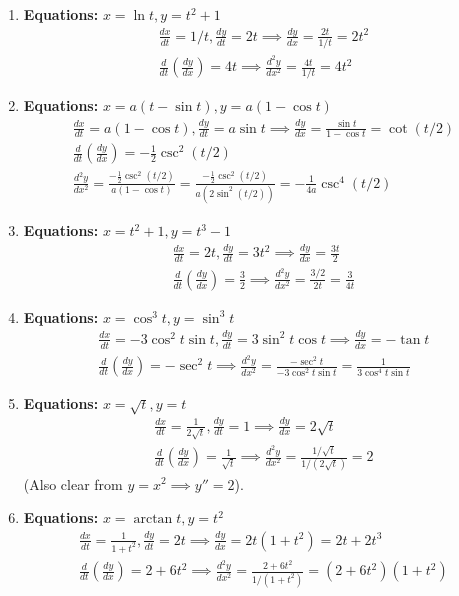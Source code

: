 \documentclass[12pt]{article}
\begin{document}
\begin{enumerate}
    \item \textbf{Equations:} $x=\ln t, y=t^2+1$
    \begin{align*}
        \frac{dx}{dt}=1/t, \frac{dy}{dt}=2t \implies \frac{dy}{dx} = \frac{2t}{1/t} = 2t^2 \\
        \frac{d}{dt}(\frac{dy}{dx}) = 4t \implies \frac{d^2y}{dx^2} = \frac{4t}{1/t} = 4t^2
    \end{align*}

    \item \textbf{Equations:} $x=a(t-\sin t), y=a(1-\cos t)$
    \begin{align*}
        \frac{dx}{dt}=a(1-\cos t), \frac{dy}{dt}=a\sin t \implies \frac{dy}{dx} = \frac{\sin t}{1-\cos t} = \cot(t/2) \\
        \frac{d}{dt}(\frac{dy}{dx}) = -\frac{1}{2}\csc^2(t/2) \\
        \frac{d^2y}{dx^2} = \frac{-\frac{1}{2}\csc^2(t/2)}{a(1-\cos t)} = \frac{-\frac{1}{2}\csc^2(t/2)}{a(2\sin^2(t/2))} = -\frac{1}{4a}\csc^4(t/2)
    \end{align*}

    \item \textbf{Equations:} $x=t^2+1, y=t^3-1$
    \begin{align*}
        \frac{dx}{dt}=2t, \frac{dy}{dt}=3t^2 \implies \frac{dy}{dx} = \frac{3t}{2} \\
        \frac{d}{dt}(\frac{dy}{dx}) = \frac{3}{2} \implies \frac{d^2y}{dx^2} = \frac{3/2}{2t} = \frac{3}{4t}
    \end{align*}
    
    \item \textbf{Equations:} $x=\cos^3 t, y=\sin^3 t$
    \begin{align*}
        \frac{dx}{dt}=-3\cos^2 t \sin t, \frac{dy}{dt}=3\sin^2 t \cos t \implies \frac{dy}{dx} = -\tan t \\
        \frac{d}{dt}(\frac{dy}{dx}) = -\sec^2 t \implies \frac{d^2y}{dx^2} = \frac{-\sec^2 t}{-3\cos^2 t \sin t} = \frac{1}{3\cos^4 t \sin t}
    \end{align*}
    
    \item \textbf{Equations:} $x=\sqrt{t}, y=t$
    \begin{align*}
        \frac{dx}{dt}=\frac{1}{2\sqrt{t}}, \frac{dy}{dt}=1 \implies \frac{dy}{dx} = 2\sqrt{t} \\
        \frac{d}{dt}(\frac{dy}{dx}) = \frac{1}{\sqrt{t}} \implies \frac{d^2y}{dx^2} = \frac{1/\sqrt{t}}{1/(2\sqrt{t})} = 2
    \end{align*}
    (Also clear from $y=x^2 \implies y''=2$).
    
    \item \textbf{Equations:} $x=\arctan t, y=t^2$
    \begin{align*}
        \frac{dx}{dt}=\frac{1}{1+t^2}, \frac{dy}{dt}=2t \implies \frac{dy}{dx} = 2t(1+t^2) = 2t+2t^3 \\
        \frac{d}{dt}(\frac{dy}{dx}) = 2+6t^2 \implies \frac{d^2y}{dx^2} = \frac{2+6t^2}{1/(1+t^2)} = (2+6t^2)(1+t^2)
    \end{align*}

\end{enumerate}
\end{document}

